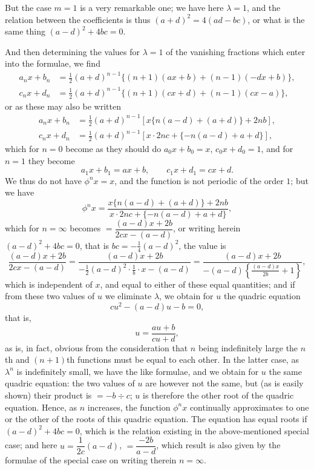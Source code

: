 \documentclass[12pt,a4paper]{article}
\begin{document}
But the case $m=1$ is a very remarkable one; we have here $\lambda = 1$, and
the relation between the coefficients is thus $(a+d)^2 = 4(ad-bc)$, or what is
the same thing $(a-d)^2 + 4bc = 0$.

And then determining the values for $\lambda = 1$ of the vanishing fractions
which enter into the formulae, we find
\begin{align*}
a_n x + b_n &= \tfrac{1}{2}(a+d)^{n-1} \{(n+1)(ax+b) + (n-1)(-dx+b)\}, \\
c_n x + d_n &= \tfrac{1}{2}(a+d)^{n-1} \{(n+1)(cx+d) + (n-1)(cx-a)\},
\end{align*}
or as these may also be written
\begin{align*}
a_n x + b_n &= \tfrac{1}{2}(a+d)^{n-1} [x\{n(a-d) + (a+d)\} + 2nb], \\
c_n x + d_n &= \tfrac{1}{2}(a+d)^{n-1} [x \cdot 2nc + \{-n(a-d) + a + d\}],
\end{align*}
which for $n=0$ become as they should do $a_0 x + b_0 = x$,
$c_0 x + d_0 = 1$, and for $n=1$ they become
%
\[
a_1 x + b_1 = ax + b, \qquad c_1 x + d_1 = cx + d.
\]
%
We thus do not have $\phi^n x = x$, and the function is not periodic of
the order $1$; but we have
%
\[
\phi^n x = \frac{x\{n(a-d) + (a+d)\} + 2nb}
{x \cdot 2nc + \{-n(a-d) + a + d\}},
\]
%
which for $n = \infty$ becomes $= \dfrac{(a-d)x + 2b}{2cx - (a-d)}$, or writing herein
$(a-d)^2 + 4bc = 0$, that is $bc = -\tfrac{1}{4}(a-d)^2$, the value is
%
\[
\frac{(a-d)x + 2b}{2cx - (a-d)} = \frac{(a-d)x + 2b}{-\tfrac{1}{2}(a-d)^2 \cdot \frac{1}{b} \cdot x - (a-d)}
= \frac{(a-d)x + 2b}{-(a-d)\left\{\frac{(a-d)x}{2b} + 1\right\}},
\]
%
which is independent of $x$, and equal to either of these equal quantities;
and if from these two values of $u$ we eliminate $\lambda$, we obtain for $u$ the
quadric equation
%
\[
cu^2 - (a-d)u - b = 0,
\]
%
that is,
%
\[
u = \frac{au+b}{cu+d},\]
%
as is, in fact, obvious from the consideration that $n$ being indefinitely large
the $n$th and $(n+1)$th functions must be equal to each other. In the latter
case, as $\lambda^n$ is indefinitely small, we have the like formulae, and we obtain
for $u$ the same quadric equation: the two values of $u$ are however not the
same, but (as is easily shown) their product is $= -b \div c$; $u$ is therefore
the other root of the quadric equation. Hence, as $n$ increases, the function
$\phi^n x$ continually approximates to one or the other of the roots of this quadric
equation. The equation has equal roots if $(a-d)^2 + 4bc = 0$, which is
the relation existing in the above-mentioned special case; and here
$u = \dfrac{1}{2c}(a-d)$, $= \dfrac{-2b}{a-d}$, which result is also given by the formulae
of the special case on writing therein $n = \infty$.
\end{document}
